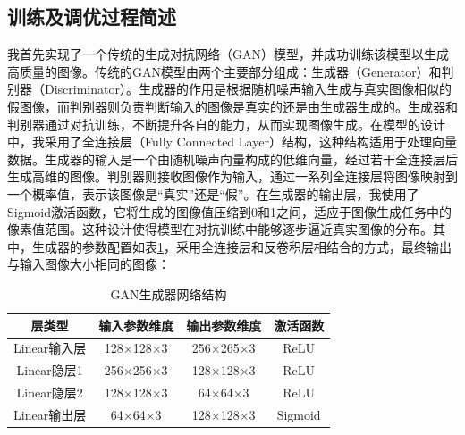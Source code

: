 \documentclass[UTF8]{ctexart}
\begin{document}
\subsection{训练及调优过程简述}
我首先实现了一个传统的生成对抗网络（GAN）模型，并成功训练该模型以生成高质量的图像。传统的GAN模型由两个主要部分组成：生成器（Generator）和判别器（Discriminator）。生成器的作用是根据随机噪声输入生成与真实图像相似的假图像，而判别器则负责判断输入的图像是真实的还是由生成器生成的。生成器和判别器通过对抗训练，不断提升各自的能力，从而实现图像生成。在模型的设计中，我采用了全连接层（Fully Connected Layer）结构，这种结构适用于处理向量数据。生成器的输入是一个由随机噪声向量构成的低维向量，经过若干全连接层后生成高维的图像。判别器则接收图像作为输入，通过一系列全连接层将图像映射到一个概率值，表示该图像是“真实”还是“假”。在生成器的输出层，我使用了Sigmoid激活函数，它将生成的图像值压缩到0和1之间，适应于图像生成任务中的像素值范围。这种设计使得模型在对抗训练中能够逐步逼近真实图像的分布。其中，生成器的参数配置如表\ref{tab:gen_gan}，采用全连接层和反卷积层相结合的方式，最终输出与输入图像大小相同的图像：
\begin{table}[htbp]
\centering
\caption{GAN生成器网络结构}
\label{tab:gen_gan}
\begin{tabular}{cccc}
\toprule[1.5pt]
\textbf{层类型} & \textbf{输入参数维度} & \textbf{输出参数维度} & \textbf{激活函数} \\
\midrule[1.5pt]
Linear输入层 & 128$\times$128$\times$3 & 256$\times$265$\times$3 & ReLU \\
Linear隐层1 & 256$\times$256$\times$3 & 128$\times$128$\times$3 & ReLU \\
Linear隐层2 & 128$\times$128$\times$3 & 64$\times$64$\times$3 & ReLU \\
Linear输出层 & 64$\times$64$\times$3 & 128$\times$128$\times$3 & Sigmoid \\
\bottomrule[1.0pt]
\end{tabular}
\end{table}
\end{document}
